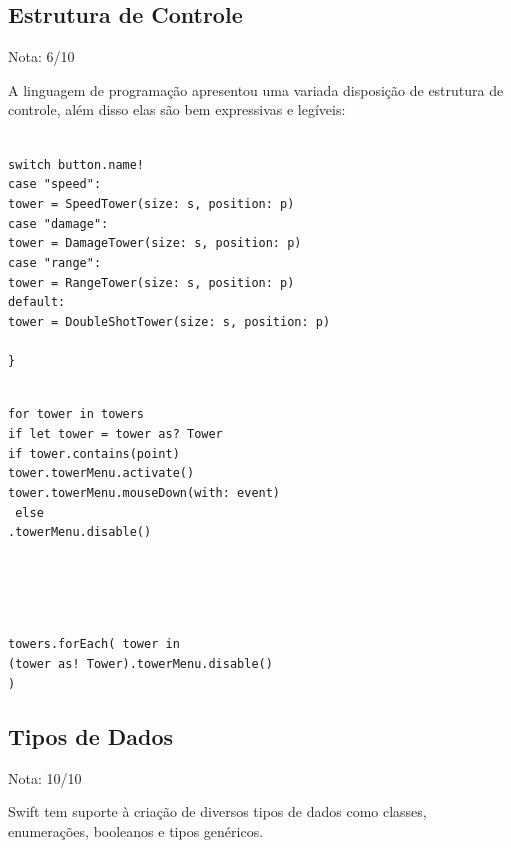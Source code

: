 \documentclass[rel_mlp]{iiufrgs}
\newcommand\tab[1][1cm]{\hspace*{#1}}
\begin{document}
\subsection{Estrutura de Controle}

Nota: 6/10

A linguagem de programação apresentou uma variada disposição de estrutura de controle, além disso elas são bem expressivas e legíveis:

\texttt{
\\switch button.name! {
\\\tab case "speed":
\\\tab\tab tower = SpeedTower(size: s, position: p)
\\\tab case "damage":
\\\tab\tab tower = DamageTower(size: s, position: p)
\\\tab case "range":
\\\tab\tab tower = RangeTower(size: s, position: p)
\\\tab default:
\\\tab\tab tower = DoubleShotTower(size: s, position: p)
\\\tab }
\\\}
}

\texttt{
\\for tower in towers {
\\\tab if let tower = tower as? Tower {
\\\tab\tab if tower.contains(point) {
\\\tab\tab\tab tower.towerMenu.activate()
\\\tab\tab\tab tower.towerMenu.mouseDown(with: event)
\\\tab\tab} else {
\\\tab\tab\tabtower.towerMenu.disable()
\\\tab\tab}
\\\tab}
\\}
}

\texttt{
\\towers.forEach({ tower in
\\\tab (tower as! Tower).towerMenu.disable()
\\})
}


\subsection{Tipos de Dados}

Nota: 10/10

Swift tem suporte à criação de diversos tipos de dados como classes, enumerações, booleanos e tipos genéricos.
\end{document}
